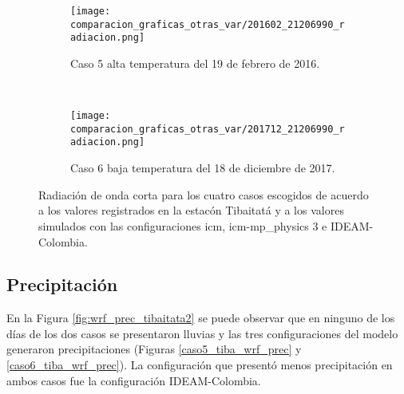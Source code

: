 \begin{figure}[H]
\centering    
\begin{subfigure}[normla]{0.4\textwidth}
\caption{Caso 5 alta temperatura del 19 de febrero de 2016.}
\label{caso5_tiba_wrf_rad}
\texttt{[image: comparacion\_graficas\_otras\_var/201602\_21206990\_radiacion.png]}
\end{subfigure}
~
\begin{subfigure}[normla]{0.4\textwidth}
\caption{Caso 6 baja temperatura del 18 de diciembre de 2017.}
\label{caso6_tiba_wrf_rad2}
\texttt{[image: comparacion\_graficas\_otras\_var/201712\_21206990\_radiacion.png]}
\end{subfigure}

    \caption{Radiación de onda corta para los cuatro casos escogidos de acuerdo a los valores registrados en la estacón Tibaitatá y a los valores simulados con las configuraciones icm, icm-mp\_physics 3 e IDEAM-Colombia.} %
    \label{fig:wrf_rad_tibaitata2}
\end{figure}


\subsection{Precipitación}

En la Figura \ref{fig:wrf_prec_tibaitata2} se puede observar que en ninguno de los días de los dos casos se presentaron lluvias y las tres configuraciones del modelo generaron precipitaciones (Figuras \ref{caso5_tiba_wrf_prec} y \ref{caso6_tiba_wrf_prec}). La configuración que presentó menos precipitación en ambos casos fue la configuración IDEAM-Colombia.\\


